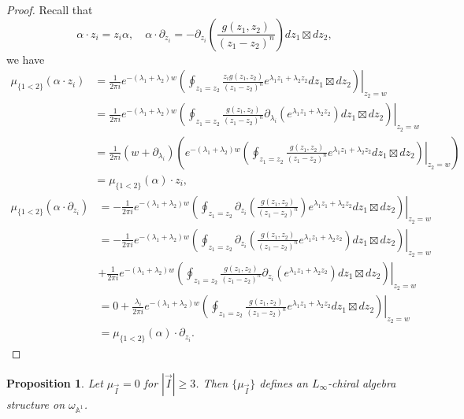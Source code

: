 \documentclass[11pt]{amsart}
\newtheorem{prop}[thm]{Proposition}
\theoremstyle{definition}
\theoremstyle{remark}
\numberwithin{equation}{section}
\begin{document}
\begin{proof}
Recall that
$$
\alpha \cdot z_{i}=z_{i}\alpha,\quad
\alpha\cdot \partial_{z_{i}}=-\partial_{z_{i}}\left(\frac{g(z_{1},z_{2})}{(z_{1}-z_{2})^{n}}\right)dz_{1}\boxtimes dz_{2},
$$
we have
\begin{align*}
\mu_{\{1<2\}}(\alpha \cdot z_{i})&=\frac{1}{2\pi i}e^{-(\lambda_{1}+\lambda_{2})w}\left. \left(\oint_{z_{1}=z_2}\frac{z_{i}g(z_{1},z_{2})}{(z_{1}-z_{2})^{n}}e^{\lambda_{1}z_{1}+\lambda_{2}z_{2}}dz_{1}\boxtimes dz_{2}\right)\right|_{z_{2}=w}\\
&=\frac{1}{2\pi i}e^{-(\lambda_{1}+\lambda_{2})w}\left. \left(\oint_{z_{1}=z_2}\frac{g(z_{1},z_{2})}{(z_{1}-z_{2})^{n}}\partial_{\lambda_{i}}\left(e^{\lambda_{1}z_{1}+\lambda_{2}z_{2}}\right)dz_{1}\boxtimes dz_{2}\right)\right|_{z_{2}=w}\\
&=\frac{1}{2\pi i}(w+\partial_{\lambda_{i}})\left(e^{-(\lambda_{1}+\lambda_{2})w}\left. \left(\oint_{z_{1}=z_2}\frac{g(z_{1},z_{2})}{(z_{1}-z_{2})^{n}}e^{\lambda_{1}z_{1}+\lambda_{2}z_{2}}dz_{1}\boxtimes dz_{2}\right)\right|_{z_{2}=w}\right)\\
&=\mu_{\{1<2\}}(\alpha )\cdot z_{i},
\end{align*}
\begin{align*}
\mu_{\{1<2\}}(\alpha \cdot \partial_{z_{i}})&=-\frac{1}{2\pi i}e^{-(\lambda_{1}+\lambda_{2})w}\left. \left(\oint_{z_{1}=z_2}\partial_{z_{i}}\left(\frac{g(z_{1},z_{2})}{(z_{1}-z_{2})^{n}}\right)e^{\lambda_{1}z_{1}+\lambda_{2}z_{2}}dz_{1}\boxtimes dz_{2}\right)\right|_{z_{2}=w}\\
&=-\frac{1}{2\pi i}e^{-(\lambda_{1}+\lambda_{2})w}\left. \left(\oint_{z_{1}=z_2}\partial_{z_{i}}\left(\frac{g(z_{1},z_{2})}{(z_{1}-z_{2})^{n}}e^{\lambda_{1}z_{1}+\lambda_{2}z_{2}}\right)dz_{1}\boxtimes dz_{2}\right)\right|_{z_{2}=w}\\
&+\frac{1}{2\pi i}e^{-(\lambda_{1}+\lambda_{2})w}\left. \left(\oint_{z_{1}=z_2}\frac{g(z_{1},z_{2})}{(z_{1}-z_{2})^{n}}\partial_{z_{i}}\left(e^{\lambda_{1}z_{1}+\lambda_{2}z_{2}}\right)dz_{1}\boxtimes dz_{2}\right)\right|_{z_{2}=w}\\
&=0+\frac{\lambda_{i}}{2\pi i}e^{-(\lambda_{1}+\lambda_{2})w}\left. \left(\oint_{z_{1}=z_2}\frac{g(z_{1},z_{2})}{(z_{1}-z_{2})^{n}}e^{\lambda_{1}z_{1}+\lambda_{2}z_{2}}dz_{1}\boxtimes dz_{2}\right)\right|_{z_{2}=w}\\
&=\mu_{\{1<2\}}(\alpha )\cdot \partial_{z_{i}}.
\end{align*}
\end{proof}
\begin{prop}
Let $\mu_{\vec{I}}=0$ for $|\vec{I}|\geq3$. Then $\{\mu_{\vec{I}}\}$ defines an $L_{\infty}$-chiral algebra structure on $\omega_{\mathbb{A}^{1}}$.
\end{prop}
\end{document}
